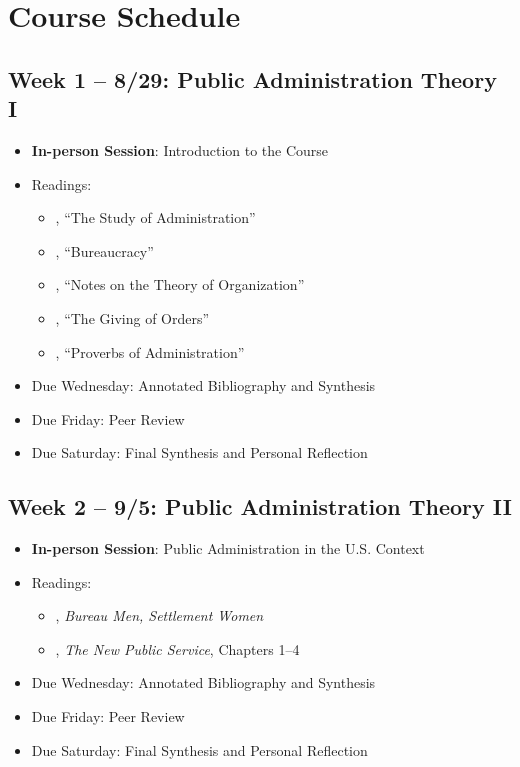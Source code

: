 \documentclass[12pt, letterpaper]{article}
\begin{document}
\section{Course Schedule}

\subsection*{Week 1 -- 8/29: Public Administration Theory I}
\begin{itemize}
    \item \textbf{In-person Session}: Introduction to the Course
    \item Readings:
        \begin{itemize}
            \item \citet{Wilson1887}, ``The Study of Administration''
            \item \citet{Weber1946}, ``Bureaucracy'' 
            \item \citet{gulick1937}, ``Notes on the Theory of Organization'' 
            \item \citet{Follett1926}, ``The Giving of Orders'' 
            \item \citet{simon1946a}, ``Proverbs of Administration'' 
        \end{itemize}
    \item Due Wednesday: Annotated Bibliography and Synthesis
    \item Due Friday: Peer Review
    \item Due Saturday: Final Synthesis and Personal Reflection
\end{itemize}


\subsection*{Week 2 -- 9/5: Public Administration Theory II}
\begin{itemize}
    \item \textbf{In-person Session}: Public Administration in the U.S. Context
    \item Readings:
        \begin{itemize}
            \item \citet{Stivers2000}, \emph{Bureau Men, Settlement Women} 
            \item \citet{Denhardt2015}, \emph{The New Public Service}, Chapters 1--4 
        \end{itemize}
        \item Due Wednesday: Annotated Bibliography and Synthesis
        \item Due Friday: Peer Review
        \item Due Saturday: Final Synthesis and Personal Reflection
\end{itemize}
\end{document}
